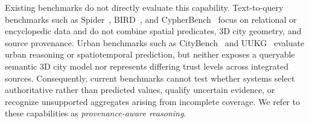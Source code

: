 \documentclass[sigconf,authordraft]{acmart}
\begin{document}
Existing benchmarks do not directly evaluate this capability. Text-to-query benchmarks such as Spider~\cite{yu_spider_2018}, BIRD~\cite{li_bird_2023}, and CypherBench~\cite{feng_cypherbench_2025} focus on relational or encyclopedic data and do not combine spatial predicates, 3D city geometry, and source provenance. Urban benchmarks such as CityBench~\cite{feng_citybench_2025} and UUKG~\cite{ning_uukg_2023} evaluate urban reasoning or spatiotemporal prediction, but neither exposes a queryable semantic 3D city model nor represents differing trust levels across integrated sources. Consequently, current benchmarks cannot test whether systems select authoritative rather than predicted values, qualify uncertain evidence, or recognize unsupported aggregates arising from incomplete coverage. We refer to these capabilities as \emph{provenance-aware reasoning}.
\end{document}

